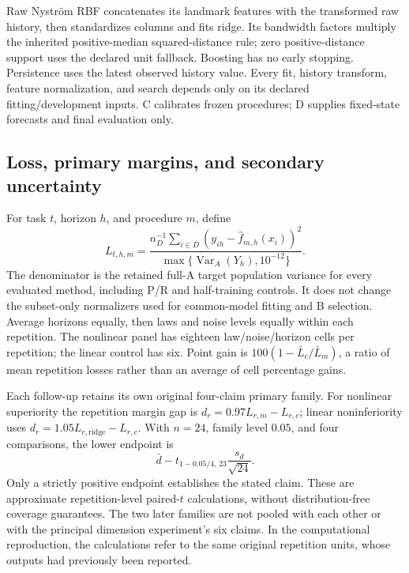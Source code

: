 Raw Nystr\"om RBF concatenates its landmark features with the transformed
raw history, then standardizes columns and fits ridge. Its bandwidth
factors multiply the inherited positive-median squared-distance rule;
zero positive-distance support uses the declared unit fallback. Boosting
has no early stopping. Persistence uses the latest observed history value.
Every fit, history transform, feature normalization, and search depends
only on its declared fitting/development inputs. C calibrates frozen
procedures; D supplies fixed-state forecasts and final evaluation only.

\subsection{Loss, primary margins, and secondary uncertainty}
\label{app:followup-inference}

For task $t$, horizon $h$, and procedure $m$, define
\begin{equation}
 L_{t,h,m}=\frac{n_D^{-1}\sum_{i\in D}
                   (y_{ih}-\widehat f_{m,h}(x_i))^2}
                   {\max\{\operatorname{Var}_A(Y_h),10^{-12}\}}.
 \label{eq:supp-followup-smse}
\end{equation}
The denominator is the retained full-A target population variance for
every evaluated method, including P/R and half-training controls. It
does not change the subset-only normalizers used for common-model fitting
and B selection. Average horizons equally, then laws and noise levels
equally within each repetition. The nonlinear panel has eighteen
law/noise/horizon cells per repetition; the linear control has six.
Point gain is $100(1-\bar L_c/\bar L_m)$, a ratio of mean repetition
losses rather than an average of cell percentage gains.

Each follow-up retains its own original four-claim primary family.
For nonlinear superiority the repetition margin gap is
$d_r=0.97L_{r,m}-L_{r,c}$; linear noninferiority uses
$d_r=1.05L_{r,\mathrm{ridge}}-L_{r,c}$.
With $n=24$, family level $0.05$, and four comparisons, the lower endpoint is
\begin{equation}
 \bar d-t_{1-0.05/4,\,23}\frac{s_d}{\sqrt{24}}.
 \label{eq:supp-followup-primary-bound}
\end{equation}
Only a strictly positive endpoint establishes the stated claim.
These are approximate repetition-level paired-$t$ calculations, without
distribution-free coverage guarantees. The two later families are not
pooled with each other or with the principal dimension experiment's six
claims. In the computational reproduction, the calculations refer to the
same original repetition units, whose outputs had previously been reported.

